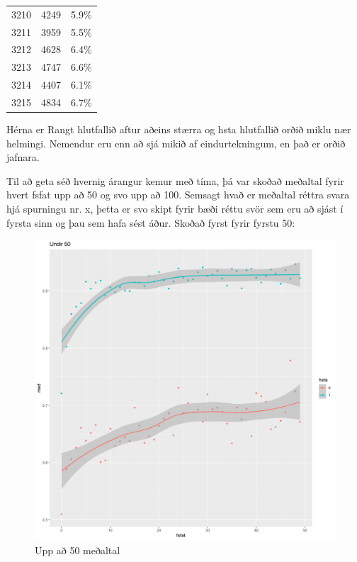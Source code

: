 \documentclass[
  12pt,
]{article}
\begin{document}
\begin{longtable}{>{\raggedright\arraybackslash}p{4cm}ll}
\hspace{1em}3210 & 4249 & 5.9\%\\
\hspace{1em}3211 & 3959 & 5.5\%\\
\hspace{1em}3212 & 4628 & 6.4\%\\
\hspace{1em}3213 & 4747 & 6.6\%\\
\hspace{1em}3214 & 4407 & 6.1\%\\
\hspace{1em}3215 & 4834 & 6.7\%\\
\bottomrule
\end{longtable}

Hérna er Rangt hlutfallið aftur aðeins stærra og hsta hlutfallið orðið miklu nær helmingi. Nemendur eru enn að sjá mikið af eindurtekningum, en það er orðið jafnara.

Til að geta séð hvernig árangur kemur með tíma, þá var skoðað meðaltal fyrir hvert fsfat upp að 50 og svo upp að 100. Semsagt hvað er meðaltal réttra svara hjá spurningu nr. x, þetta er svo skipt fyrir bæði réttu svör sem eru að sjást í fyrsta sinn og þau sem hafa sést áður. Skoðað fyrst fyrir fyrstu 50:

\begin{figure}[H]

{\centering \includegraphics[width=1\linewidth]{Imgsimplify/plotbymean50} 

}

\caption{Upp að 50 meðaltal}\label{fig:pltbymean50}
\end{figure}
\end{document}
